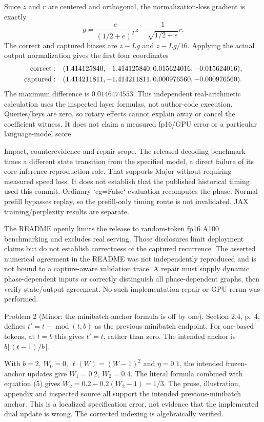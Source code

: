 \documentclass[10pt]{article}
\begin{document}
Since \(z\) and \(r\) are centered and orthogonal, the normalization-loss gradient is exactly \[g=\frac{e}{(1/2+e)^2}z-\frac{1}{\sqrt{1/2+e}}r.\] The correct and captured biases are \(z-Lg\) and \(z-Lg/16\). Applying the actual output normalization gives the first four coordinates \[\begin{aligned}
 {\rm correct}:&\quad
 (1.414125840,-1.414125840,0.015624016,-0.015624016),\\
 {\rm captured}:&\quad
 (1.414211811,-1.414211811,0.000976560,-0.000976560).\end{aligned}\] The maximum difference is \(0.0146474553\). This independent real-arithmetic calculation uses the inspected layer formulas, not author-code execution. Queries/keys are zero, so rotary effects cannot explain away or cancel the coefficient witness. It does not claim a measured fp16/GPU error or a particular language-model score.\par
Impact, counterevidence and repair scope. The released decoding benchmark times a different state transition from the specified model, a direct failure of its core inference-reproduction role. That supports Major without requiring measured speed loss. It does not establish that the published historical timing used this commit. Ordinary `cg=False` evaluation recomputes the phase. Normal prefill bypasses replay, so the prefill-only timing route is not invalidated. JAX training/perplexity results are separate.\par
The README openly limits the release to random-token fp16 A100 benchmarking and excludes real serving. Those disclosures limit deployment claims but do not establish correctness of the captured recurrence. The asserted numerical agreement in the README was not independently reproduced and is not bound to a capture-aware validation trace. A repair must supply dynamic phase-dependent inputs or correctly distinguish all phase-dependent graphs, then verify state/output agreement. No such implementation repair or GPU rerun was performed.\par
Problem 2 (Minor: the minibatch-anchor formula is off by one).  Section 2.4, p. 4, defines \(t'=t-\operatorname{mod}(t,b)\) as the previous minibatch endpoint. For one-based tokens, at \(t=b\) this gives \(t'=t\), rather than zero. The intended anchor is \(b\lfloor(t-1)/b\rfloor\).\par
With \(b=2\), \(W_0=0\), \(\ell(W)=(W-1)^2\) and \(\eta=0.1\), the intended frozen-anchor updates give \(W_1=0.2\), \(W_2=0.4\). The literal formula combined with equation (5) gives \(W_2=0.2-0.2(W_2-1)=1/3\). The prose, illustration, appendix and inspected source all support the intended previous-minibatch anchor. This is a localized specification error, not evidence that the implemented dual update is wrong. The corrected indexing is algebraically verified.\par
\end{document}
